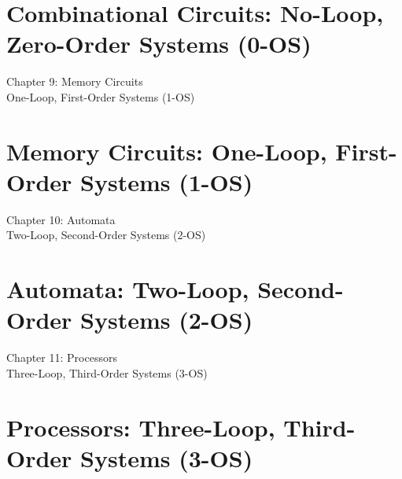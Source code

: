 \documentclass[aspectratio=169,11pt]{beamer}
\begin{document}
\section{Combinational Circuits: No-Loop, Zero-Order Systems (0-OS)}


\begin{frame}
\begin{center}
{\Huge Chapter 9: Memory Circuits}\\[0.5cm]
{\Large One-Loop, First-Order Systems (1-OS)}\\[0.5cm]
\end{center}
\end{frame}

\section{Memory Circuits: One-Loop, First-Order Systems (1-OS)}


\begin{frame}
\begin{center}
{\Huge Chapter 10: Automata}\\[0.5cm]
{\Large Two-Loop, Second-Order Systems (2-OS)}\\[0.5cm]
\end{center}
\end{frame}

\section{Automata: Two-Loop, Second-Order Systems (2-OS)}


\begin{frame}
\begin{center}
{\Huge Chapter 11: Processors}\\[0.5cm]
{\Large Three-Loop, Third-Order Systems (3-OS)}\\[0.5cm]
\end{center}
\end{frame}

\section{Processors: Three-Loop, Third-Order Systems (3-OS)}

\end{document}

